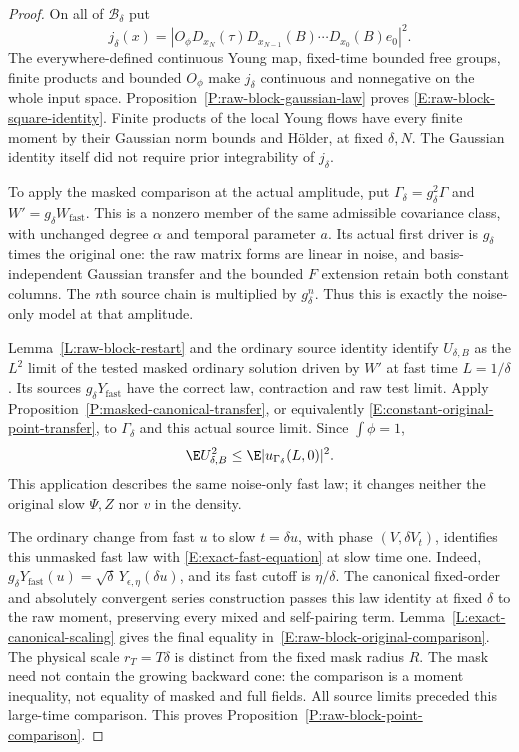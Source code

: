 \begin{proof}
  On all of $\mathscr B_\delta$ put
  \[
    j_\delta(x)=
    |O_\phi D_{x_N}(\tau)D_{x_{N-1}}(B)\cdots D_{x_0}(B)e_0|^2.
  \]
  The everywhere-defined continuous Young map, fixed-time bounded
  free groups, finite products and bounded $O_\phi$ make $j_\delta$
  continuous and nonnegative on the whole input space.
  Proposition~\ref{P:raw-block-gaussian-law} proves
  \eqref{E:raw-block-square-identity}. Finite products of the local
  Young flows have every finite moment by their Gaussian norm bounds
  and H\"older, at fixed $\delta,N$. The Gaussian identity itself
  did not require prior integrability of $j_\delta$.

  To apply the masked comparison at the actual amplitude, put
  $\Gamma_\delta=g_\delta^2\Gamma$ and
  $W'=g_\delta W_{\mathrm{fast}}$.
  This is a nonzero member of the same admissible covariance class,
  with unchanged degree $\alpha$ and temporal parameter $a$.
  Its actual first driver is $g_\delta$ times the original one:
  the raw matrix forms are linear in noise, and basis-independent
  Gaussian transfer and the bounded $F$ extension retain both
  constant columns. The $n$th source chain is multiplied by
  $g_\delta^n$. Thus this is exactly the noise-only model at that
  amplitude.

  Lemma~\ref{L:raw-block-restart} and the ordinary source identity
  identify $U_{\delta,B}$ as the $L^2$ limit of the tested masked
  ordinary solution driven by $W'$ at fast time $L=1/\delta$.
  Its sources $g_\delta Y_{\mathrm{fast}}$ have the correct law,
  contraction and raw test limit. Apply
  Proposition~\ref{P:masked-canonical-transfer}, or equivalently
  \eqref{E:constant-original-point-transfer}, to $\Gamma_\delta$
  and this actual source limit. Since $\int\phi=1$,
  \[
    \E U_{\delta,B}^2
    \le\E|u_{\Gamma_\delta}(L,0)|^2.
  \]
  This application describes the same noise-only fast law; it
  changes neither the original slow $\Psi,Z$ nor $v$ in the density.

  The ordinary change from fast $u$ to slow $t=\delta u$, with
  phase $(V,\delta V_t)$, identifies this unmasked fast law with
  \eqref{E:exact-fast-equation} at slow time one. Indeed,
  $g_\delta Y_{\mathrm{fast}}(u)
  =\sqrt\delta\,Y_{\epsilon,\eta}(\delta u)$,
  and its fast cutoff is $\eta/\delta$.
  The canonical fixed-order and absolutely convergent series
  construction passes this law identity at fixed $\delta$ to the
  raw moment, preserving every mixed and self-pairing term.
  Lemma~\ref{L:exact-canonical-scaling} gives the final equality
  in~\eqref{E:raw-block-original-comparison}.
  The physical scale $r_T=T\delta$ is distinct from the fixed
  mask radius $R$. The mask need not contain the growing backward
  cone: the comparison is a moment inequality, not equality of
  masked and full fields. All source limits preceded this large-time
  comparison.
  This proves Proposition~\ref{P:raw-block-point-comparison}.
\end{proof}

